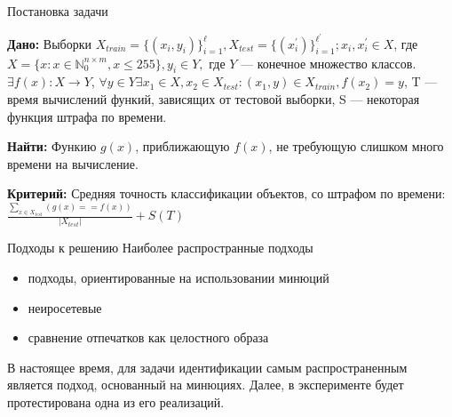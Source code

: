 \documentclass{beamer}
\begin{document}
\begin{frame}{Постановка задачи}
    

    \vspace{0.5cm}

    \textbf{Дано:}
    Выборки $X_{train} = \{(x_{i}, y_{i})\}_{i = 1}^{\ell}, X_{test} = \{(x_{i}^{'})\}_{i = 1}^{\ell^{'}}; x_{i}, x_{i}^{'} \in X$, где $  X = \{x: x \in \mathbb{N}_{0}^{n \times m}, x \leq 255\}, y_{i} \in Y, $ где $Y$ — конечное множество классов. $\exists f(x): X \to Y$, $\forall y \in Y \exists x_{1} \in X,  x_{2} \in X_{test}: (x_{1}, y) \in X_{train}, f(x_{2}) = y $,
    T — время вычислений функий, зависящих от тестовой выборки, S — некоторая функция штрафа по времени.
    
    
    \vspace{0.3cm}
    
    \textbf{Найти:}
    Функию $g(x)$, приближающую $f(x)$, не требующую слишком много времени на вычисление.
    
    \vspace{0.3cm}
    
    \textbf{Критерий:}
    Средняя точность классификации объектов, со штрафом по времени: $\frac{\sum_{x \in {X_{test}}}(g(x) == f(x))}{|X_{test}|} + S(T)$
\end{frame}


\begin{frame}{Подходы к решению}
    Наиболее распространные подходы
    \begin{itemize}
        \item подходы, ориентированные на использовании минюций
        \item неиросетевые
        \item сравнение отпечатков как целостного образа
        
    \end{itemize}
    В настоящее время, для задачи идентификации самым распространенным является подход, основанный на минюциях. Далее, в эксперименте будет протестирована одна из его реализаций.
    

\end{frame}
\end{document}
